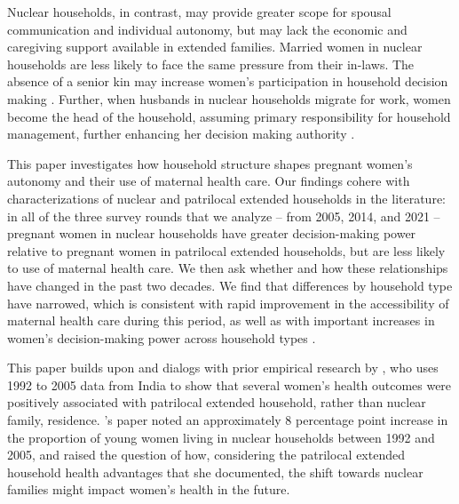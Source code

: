 \documentclass[12pt]{article}
\begin{document}
Nuclear households, in contrast, may provide greater scope for spousal communication and individual autonomy, but may lack the economic and caregiving support available in extended families. Married women in nuclear households are less likely to face the same pressure from their in-laws. The absence of a senior kin may increase women’s participation in household decision making \citep{simkhada2010role,char2010influence}. Further, when husbands in nuclear households migrate for work, women become the head of the household, assuming primary responsibility for  household management, further enhancing her decision making authority \citep{desai2008negotiated}. 

This paper investigates how household structure shapes pregnant women's autonomy and their use of maternal health care.  Our findings cohere with characterizations of nuclear and patrilocal extended households in the literature: in all of the three survey rounds that we analyze -- from 2005, 2014, and 2021 -- pregnant women in nuclear households have greater decision-making power relative to pregnant women in patrilocal extended households, but are less likely to use of maternal health care.  We then ask whether and how these relationships have changed in the past two decades.  We find that differences by household type have narrowed, which is consistent with rapid improvement in the accessibility of maternal health care during this period, as well as with important increases in women's decision-making power across household types\citep{ram2026investigation, gandhi2022predictors, muralidharan2017cycling, rai2022use} .

This paper builds upon and dialogs with prior empirical research by \cite{allendorf2013going}, who uses 1992 to 2005 data from India to show that several women's health outcomes were positively associated with patrilocal extended household, rather than nuclear family, residence.  \cite{allendorf2013going}'s paper noted an approximately 8 percentage point increase in the proportion of young women living in nuclear households between 1992 and 2005, and raised the question of how, considering the patrilocal extended household health advantages that she documented, the shift towards nuclear families might impact women's health in the future.  
\end{document}
